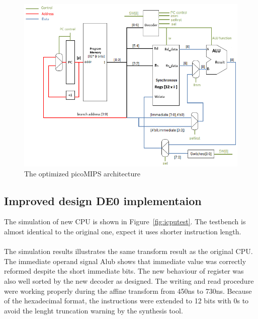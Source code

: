 \begin{figure}[H]
		\centering
		\includegraphics[width = \textwidth]{Figures/newarch}		
		\caption{The optimized picoMIPS architecture \cite{oldarcdigram}}
		\label {fig:newarc}
\end{figure}

\subsection{Improved design DE0 implementaion}
The simulation of new CPU is shown in Figure~\ref{fig:icputest}. The testbench is almost identical to the original one, expect it uses shorter instruction length.\\\\
The simulation results illustrates the same transform result as the original CPU. The immediate operand signal Alub shows that immediate value was correctly reformed despite the short immediate bits. The new behaviour of register was also well sorted by the new decoder as designed. The writing and read procedure were working properly during the affine transform from 450ns to 730ns. Because of the hexadecimal format, the instructions were extended to 12 bits with 0s to avoid the lenght truncation warning by the synthesis tool. 

